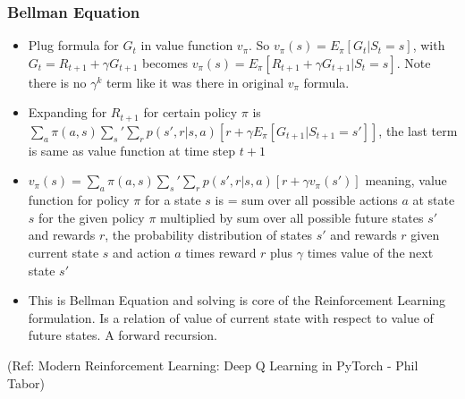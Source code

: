 \begin{frame}[fragile]\frametitle{Bellman Equation}

\begin{itemize}
\item Plug formula for $G_t$ in value function $v_{\pi}$. So $v_{\pi}(s) = E_{\pi}[G_t|S_t=s]$, with $G_t = R_{t+1}+ \gamma G_{t+1}$ becomes $v_{\pi}(s) = E_{\pi}[R_{t+1}+ \gamma G_{t+1}|S_t=s]$. Note there is no $\gamma^k$ term like it was there in original $v_{\pi}$ formula.
\item Expanding for $R_{t+1}$ for certain policy $\pi$ is $\sum_a \pi(a,s) \sum_s' \sum_r p(s',r|s,a) [r + \gamma E_{\pi} [G_{t+1}|S_{t+1}=s']]$, the last term is same as value function at time step $t+1$
\item $v_{\pi}(s) = \sum_a \pi(a,s) \sum_s' \sum_r p(s',r|s,a) [r + \gamma v_{\pi}(s')]$ meaning, value function for policy $\pi$ for a state $s$ is = sum over all possible actions $a$ at state $s$ for the given policy $\pi$ multiplied by sum over all possible future states $s'$ and rewards $r$, the probability distribution of states $s'$ and rewards $r$ given current state $s$ and action $a$ times reward $r$ plus $\gamma$ times value of the next state $s'$
\item This is Bellman Equation and solving is core of the Reinforcement Learning formulation. Is a relation of value of current state with respect to value of future states. A forward recursion.
\end{itemize}

{\tiny (Ref: Modern Reinforcement Learning: Deep Q Learning in PyTorch - Phil Tabor)}

\end{frame}


